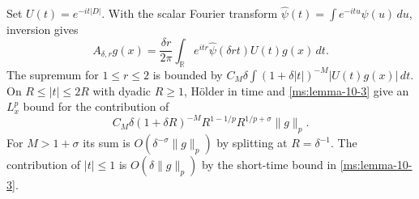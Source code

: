 Set $U(t)=e^{-it|D|}$. With the scalar Fourier transform $\widehat\psi(t)=\int e^{-itu}\psi(u)\,du$, inversion gives
\[
 A_{\delta,r}g(x)=\frac{\delta r}{2\pi}
 \int_{\mathbb R}e^{itr}\widehat\psi(\delta rt)U(t)g(x)\,dt.
\]
The supremum for $1\le r\le2$ is bounded by $C_M\delta\int(1+\delta|t|)^{-M}|U(t)g(x)|\,dt$. On $R\le|t|\le2R$ with dyadic $R\ge1$, H\"older in time and \ref{ms:lemma-10-3} give an $L_x^p$ bound for the contribution of
\[
 C_M\delta(1+\delta R)^{-M}R^{1-1/p}R^{1/p+\sigma}\|g\|_p.
\]
For $M>1+\sigma$ its sum is $O(\delta^{-\sigma}\|g\|_p)$ by splitting at $R=\delta^{-1}$. The contribution of $|t|\le1$ is $O(\delta\|g\|_p)$ by the short-time bound in \ref{ms:lemma-10-3}.

